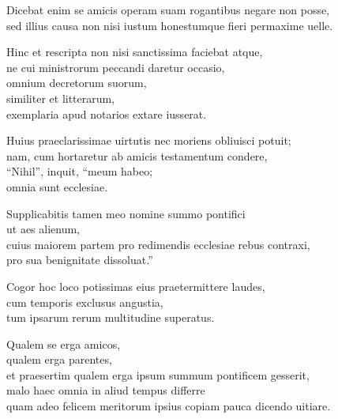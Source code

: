 \documentclass[a5paper,twoside]{article}
\begin{document}
Dicebat enim se amicis operam suam rogantibus negare non posse, \\
sed illius causa non nisi iustum honestumque fieri permaxime uelle.   

Hinc et rescripta non nisi sanctissima faciebat atque, \\
ne cui ministrorum peccandi daretur occasio, \\
omnium decretorum suorum, \\
similiter et litterarum, \\
exemplaria apud notarios extare iusserat.  

Huius praeclarissimae uirtutis nec moriens obliuisci potuit; \\
nam, cum hortaretur ab amicis testamentum condere, \\
``Nihil'', inquit, ``meum habeo; \\
omnia sunt ecclesiae. 

Supplicabitis tamen meo nomine summo pontifici \\
ut aes alienum, \\
cuius maiorem partem pro redimendis ecclesiae rebus contraxi, \\
pro sua benignitate dissoluat.''

Cogor hoc loco potissimas eius praetermittere laudes, \\
cum temporis exclusus angustia, \\
tum ipsarum rerum multitudine superatus.

Qualem se erga amicos, \\
qualem erga parentes, \\
et praesertim qualem erga ipsum summum pontificem gesserit, \\
malo haec omnia in aliud tempus differre \\
quam adeo felicem meritorum ipsius copiam pauca dicendo uitiare.   
\end{document}

